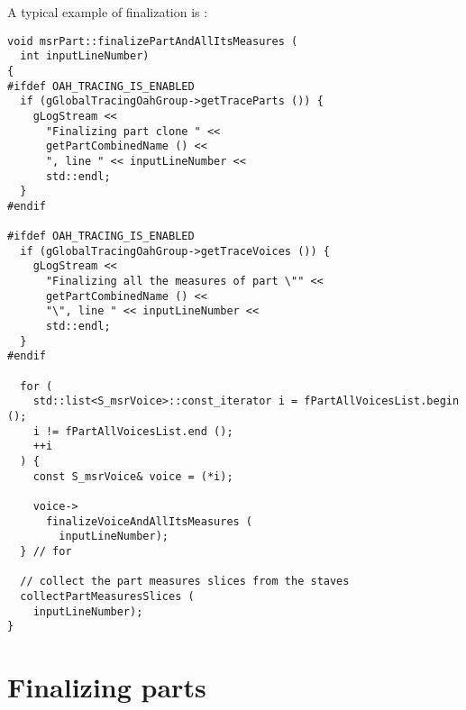A typical example of \cascading finalization is :
\begin{lstlisting}[language=CPlusPlus]
void msrPart::finalizePartAndAllItsMeasures (
  int inputLineNumber)
{
#ifdef OAH_TRACING_IS_ENABLED
  if (gGlobalTracingOahGroup->getTraceParts ()) {
    gLogStream <<
      "Finalizing part clone " <<
      getPartCombinedName () <<
      ", line " << inputLineNumber <<
      std::endl;
  }
#endif

#ifdef OAH_TRACING_IS_ENABLED
  if (gGlobalTracingOahGroup->getTraceVoices ()) {
    gLogStream <<
      "Finalizing all the measures of part \"" <<
      getPartCombinedName () <<
      "\", line " << inputLineNumber <<
      std::endl;
  }
#endif

  for (
    std::list<S_msrVoice>::const_iterator i = fPartAllVoicesList.begin ();
    i != fPartAllVoicesList.end ();
    ++i
  ) {
    const S_msrVoice& voice = (*i);

    voice->
      finalizeVoiceAndAllItsMeasures (
        inputLineNumber);
  } // for

  // collect the part measures slices from the staves
  collectPartMeasuresSlices (
    inputLineNumber);
}
\end{lstlisting}


\section{Finalizing parts}

